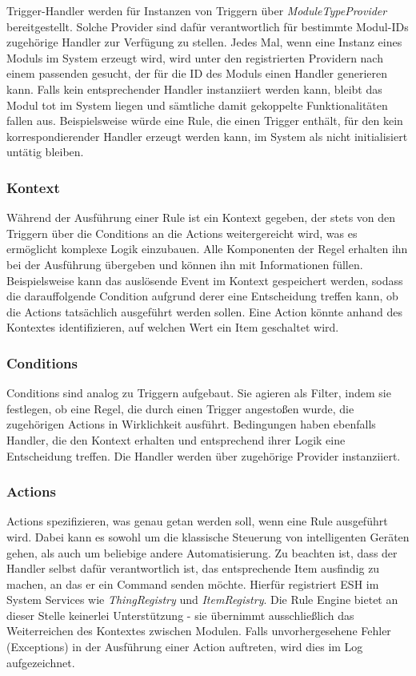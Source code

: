 Trigger-Handler werden für Instanzen von Triggern über \textit{ModuleTypeProvider} bereitgestellt. Solche Provider sind dafür verantwortlich für bestimmte Modul-IDs zugehörige Handler zur Verfügung zu stellen. Jedes Mal, wenn eine Instanz eines Moduls im System erzeugt wird, wird unter den registrierten Providern nach einem passenden gesucht, der für die ID des Moduls einen Handler generieren kann. Falls kein entsprechender Handler instanziiert werden kann, bleibt das Modul tot im System liegen und sämtliche damit gekoppelte Funktionalitäten fallen aus. Beispielsweise würde eine Rule, die einen Trigger enthält, für den kein korrespondierender Handler erzeugt werden kann, im System als \glqq nicht initialisiert\grqq{} untätig bleiben.

\subsubsection{Kontext}
\label{subsubsec:kontext}
Während der Ausführung einer Rule ist ein Kontext gegeben, der stets von den Triggern über die Conditions an die Actions weitergereicht wird, was es ermöglicht komplexe Logik einzubauen. Alle Komponenten der Regel erhalten ihn bei der Ausführung übergeben und können ihn mit Informationen füllen. Beispielsweise kann das auslösende Event im Kontext gespeichert werden, sodass die darauffolgende Condition aufgrund derer eine Entscheidung treffen kann, ob die Actions tatsächlich ausgeführt werden sollen. Eine Action könnte anhand des Kontextes identifizieren, auf welchen Wert ein Item geschaltet wird.

\subsubsection{Conditions}
Conditions sind analog zu Triggern aufgebaut. Sie agieren als Filter, indem sie festlegen, ob eine Regel, die durch einen Trigger angestoßen wurde, die zugehörigen Actions in Wirklichkeit ausführt. Bedingungen haben ebenfalls Handler, die den Kontext erhalten und entsprechend ihrer Logik eine Entscheidung treffen. Die Handler werden über zugehörige Provider instanziiert.

\subsubsection{Actions}
Actions spezifizieren, was genau getan werden soll, wenn eine Rule ausgeführt wird. Dabei kann es sowohl um die klassische Steuerung von intelligenten Geräten gehen, als auch um beliebige andere Automatisierung. Zu beachten ist, dass der Handler selbst dafür verantwortlich ist, das entsprechende Item ausfindig zu machen, an das er ein Command senden möchte. Hierfür registriert ESH im System Services wie \textit{ThingRegistry} und \textit{ItemRegistry}. Die Rule Engine bietet an dieser Stelle keinerlei Unterstützung - sie übernimmt ausschließlich das Weiterreichen des Kontextes zwischen Modulen. Falls unvorhergesehene Fehler (Exceptions) in der Ausführung einer Action auftreten, wird dies im Log aufgezeichnet.


